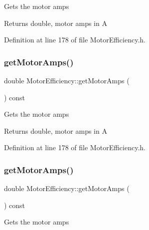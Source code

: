 Gets the motor amps

\begin{DoxyReturn}{Returns}
double, motor amps in A 
\end{DoxyReturn}


Definition at line 178 of file Motor\+Efficiency.\+h.

\mbox{\label{class_motor_efficiency_a955906509a4b49274b35c1b119c4a4b4}} 
\subsubsection{\texorpdfstring{get\+Motor\+Amps()}{getMotorAmps()}\hspace{0.1cm}{\footnotesize\ttfamily [2/3]}}
{\footnotesize\ttfamily double Motor\+Efficiency\+::get\+Motor\+Amps (\begin{DoxyParamCaption}{ }\end{DoxyParamCaption}) const\hspace{0.3cm}{\ttfamily [inline]}}

Gets the motor amps

\begin{DoxyReturn}{Returns}
double, motor amps in A 
\end{DoxyReturn}


Definition at line 178 of file Motor\+Efficiency.\+h.

\mbox{\label{class_motor_efficiency_a955906509a4b49274b35c1b119c4a4b4}} 
\subsubsection{\texorpdfstring{get\+Motor\+Amps()}{getMotorAmps()}\hspace{0.1cm}{\footnotesize\ttfamily [3/3]}}
{\footnotesize\ttfamily double Motor\+Efficiency\+::get\+Motor\+Amps (\begin{DoxyParamCaption}{ }\end{DoxyParamCaption}) const\hspace{0.3cm}{\ttfamily [inline]}}

Gets the motor amps

